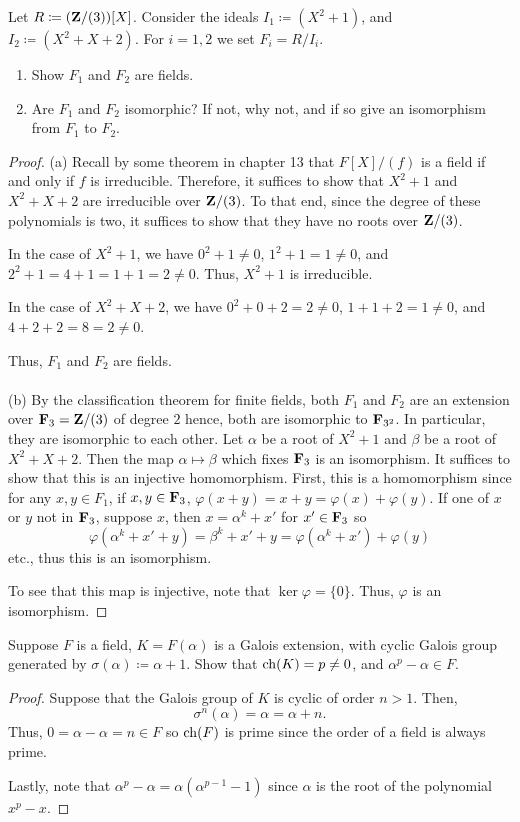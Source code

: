 \begin{problem}
Let $R\coloneqq(\mathbf{Z}/(3))[X]$. Consider the ideals $I_1\coloneqq(X^2+1)$,
and $I_2\coloneqq(X^2+X+2)$. For $i=1,2$ we set $F_i=R/I_i$.
\begin{enumerate}[label=(\alph*)]
\item Show $F_1$ and $F_2$ are fields.
\item Are $F_1$ and $F_2$ isomorphic? If not, why not, and if so give an
  isomorphism from $F_1$ to $F_2$.
\end{enumerate}
\end{problem}
\begin{proof}
(a) Recall by some theorem in chapter 13 that $F[X]/(f)$ is a field
if and only if $f$ is irreducible. Therefore, it suffices to show that
$X^2+1$ and $X^2+X+2$ are irreducible over $\mathbf{Z}/(3)$. To that end, since
the degree of these polynomials is two, it suffices to show that they have
no roots over $\mathbf{Z}/(3)$.

In the case of $X^2+1$, we have $0^2+1\neq 0$, $1^2+1=1\neq 0$, and
$2^2+1=4+1=1+1=2\neq 0$. Thus, $X^2+1$ is irreducible.

In the case of $X^2+X+2$, we have $0^2+0+2=2\neq 0$, $1+1+2=1\neq 0$, and
$4+2+2=8=2\neq 0$.

Thus, $F_1$ and $F_2$ are fields.
\\\\
(b) By the classification theorem for finite fields, both $F_1$ and $F_2$
are an extension over $\mathbf{F}_3=\mathbf{Z}/(3)$ of degree $2$ hence, both are
isomorphic to $\mathbf{F}_{3^2}$. In particular, they are isomorphic to each
other. Let $\alpha$ be a root of $X^2+1$ and $\beta$ be a root of
$X^2+X+2$. Then the map $\alpha\mapsto\beta$ which fixes $\mathbf{F}_3$ is an
isomorphism. It suffices to show that this is an injective
homomorphism. First, this is a homomorphism since for any $x,y\in F_1$,
if $x,y\in\mathbf{F}_3$, $\varphi(x+y)=x+y=\varphi(x)+\varphi(y)$. If one of
$x$ or $y$ not in $\mathbf{F}_3$, suppose $x$, then $x=\alpha^k+x'$ for
$x'\in\mathbf{F}_3$ so
\[
\varphi(\alpha^k+x'+y)=\beta^k+x'+y=\varphi(\alpha^k+x')+\varphi(y)
\]
etc., thus this is an isomorphism.

To see that this map is injective, note that $\ker\varphi=\{0\}$. Thus,
$\varphi$ is an isomorphism.
\end{proof}

\begin{problem}
Suppose $F$ is a field, $K=F(\alpha)$ is a Galois extension, with cyclic
Galois group generated by $\sigma(\alpha)\coloneqq\alpha+1$. Show that
$\operatorname{ch}(K)=p\neq 0$, and $\alpha^p-\alpha\in F$.
\end{problem}
\begin{proof}
Suppose that the Galois group of $K$ is cyclic of order $n>1$. Then,
\[
\sigma^n(\alpha)=\alpha=\alpha+n.
\]
Thus, $0=\alpha-\alpha=n\in F$ so $\operatorname{ch}(F)$ is prime since the order of a
field is always prime.

Lastly, note that $\alpha^p-\alpha=\alpha(\alpha^{p-1}-1)$ since $\alpha$
is the root of the polynomial $x^p-x$.
\end{proof}


